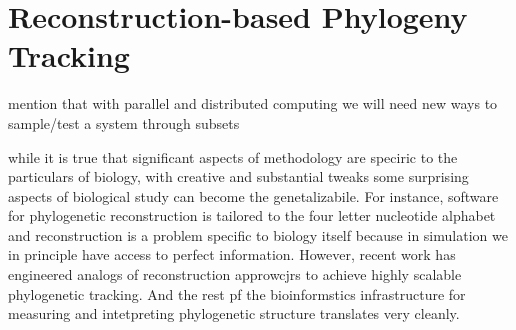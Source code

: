 \section{Reconstruction-based Phylogeny Tracking}

\citep{moreno2022hstrat,moreno2024guide}

mention that with parallel and distributed computing we will need new ways to sample/test a system through subsets

while it is true that significant aspects of methodology are speciric to the particulars of biology, with creative and substantial tweaks some surprising aspects of biological study can become the genetalizabile.
For instance, software for phylogenetic reconstruction is tailored to the four letter nucleotide alphabet and reconstruction is a problem specific to biology itself because in simulation we in principle have access to perfect information.
However, recent work has engineered analogs of reconstruction approwcjrs to achieve highly scalable phylogenetic tracking.
And the rest pf the bioinformstics infrastructure for measuring and intetpreting phylogenetic structure translates very cleanly.
